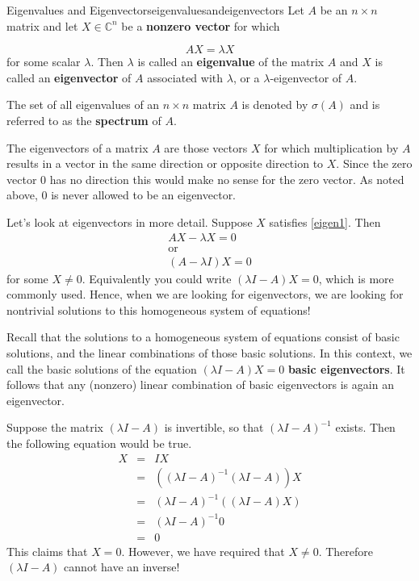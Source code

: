 \begin{definition}{Eigenvalues and Eigenvectors}{eigenvaluesandeigenvectors}
Let $A$ be an $n\times n$ matrix and let $X \in \mathbb{C}^{n}$ be a
\textbf{nonzero vector} for which

\begin{equation}
AX=\lambda X  \label{eigen1}
\end{equation}
for some scalar $\lambda .$ Then $\lambda $ is called an
\textbf{eigenvalue}
of the matrix $A$ and $X$ is called an \textbf{eigenvector} of $A$ associated with $\lambda$, or a $\lambda$-eigenvector of $A$. 
 
The set of all eigenvalues of an $n\times n$ matrix $A$ is denoted by 
$\sigma \left( A\right) $ and is referred to as the \textbf{spectrum} of $A.$
\end{definition}

The eigenvectors of a matrix $A$ are those vectors $X$ for which
multiplication by $A$ results in a vector in the same direction or opposite
direction to $X$. Since the zero vector $0$ has no
direction this would make no sense for the zero vector. As noted above, 
$0$ is never allowed to be an eigenvector. 

Let's look at eigenvectors in more detail. Suppose $X$ satisfies \ref{eigen1}. Then
\begin{equation*}
\begin{array}{c}
AX - \lambda X = 0 \\
\mbox{or} \\
\left( A-\lambda I\right) X = 0
\end{array}
\end{equation*}
for some $X \neq 0.$ Equivalently you could write $\left( \lambda
I-A\right)X = 0$, which is more commonly used.  Hence, when we are looking for eigenvectors, we are
looking for nontrivial solutions to this homogeneous system of equations!

Recall that the solutions to a homogeneous system of equations consist
of basic solutions, and the linear combinations of those basic
solutions. In this context, we call the basic solutions of the
equation $\left( \lambda I - A\right) X = 0$ \textbf{basic
eigenvectors}. It follows that any (nonzero) linear combination of basic
eigenvectors is again an eigenvector.

Suppose the matrix $\left(\lambda I - A\right)$ is invertible, so that
$\left(\lambda I - A\right)^{-1}$ exists.
Then the following equation would be true.
\begin{eqnarray*}
X &=& IX \\
&=& \left( \left( \lambda I - A\right) ^{-1}\left(\lambda I - A \right)
\right) X \\
&=&\left( \lambda I - A\right) ^{-1}\left( \left( \lambda
I - A\right) X\right) \\
&=& \left( \lambda I - A\right) ^{-1}0 \\
&=& 0
\end{eqnarray*}
This claims that $X=0$. However, we have required that $ X \neq 0$. Therefore  $\left(\lambda I - A\right)$
cannot have an inverse! 

